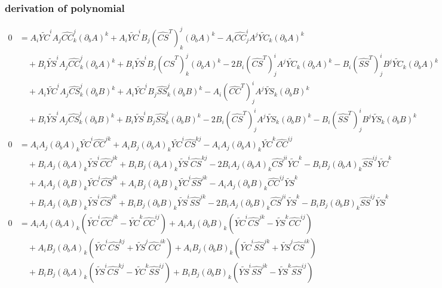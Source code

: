 \documentclass[notitlepage]{article}
\newcommand{\YC}[1][n]{\widetilde{YC}}
\newcommand{\YS}[1][n]{\widetilde{YS}}
\newcommand{\hatCS}[1][nm]{\widehat{CS}}
\newcommand{\hatCC}[1][nm]{\widehat{CC}}
\newcommand{\hatSS}[1][nm]{\widehat{SS}}
\newcommand{\dA}{(\partial_b A)}
\newcommand{\dB}{(\partial_b B)}
\begin{document}
\subsubsection{derivation of polynomial}

\begin{align*}
0 &= A_i\YC^iA_j\hatCC^j_k\dA^k + A_i\YC^iB_j(\hatCS^T)^j_k\dA^k - A_i\hatCC^i_j A^j\YC_k\dA^k\\
  &\quad + B_i\YS^iA_j\hatCC^j_k\dA^k + B_i\YS^iB_j(\hatCS^T)^j_k\dA^k - 2B_i(\hatCS^T)^i_jA^j\YC_k\dA^k - B_i(\hatSS^T)^i_jB^j\YC_k\dA^k\\
  &\quad + A_i\YC^iA_j\hatCS^j_k\dB^k + A_i\YC^iB_j\hatSS^j_k\dB^k - A_i(\hatCC^T)^i_j A^j\YS_k\dB^k\\
  &\quad + B_i\YS^iA_j\hatCS^j_k\dB^k + B_i\YS^iB_j\hatSS^j_k\dB^k - 2B_i(\hatCS^T)^i_jA^j\YS_k\dB^k - B_i(\hatSS^T)^i_jB^j\YS_k\dB^k\\
0 &= A_iA_j\dA_k\YC^i\hatCC^{jk} + A_iB_j\dA_k\YC^i\hatCS^{kj} - A_iA_j\dA_k\YC^k\hatCC^{ij}\\
  &\quad + B_iA_j\dA_k\YS^i\hatCC^{jk} + B_iB_j\dA_k\YS^i\hatCS^{kj} - 2B_iA_j\dA_k\hatCS^{ji}\YC^k - B_iB_j\dA_k\hatSS^{ij}\YC^k\\
  &\quad + A_iA_j\dB_k\YC^i\hatCS^{jk} + A_iB_j\dB_k\YC^i\hatSS^{jk} - A_iA_j\dB_k\hatCC^{ij}\YS^k\\
  &\quad + B_iA_j\dB_k\YS^i\hatCS^{jk} + B_iB_j\dB_k\YS^i\hatSS^{jk} - 2B_iA_j\dB_k\hatCS^{ji}\YS^k - B_iB_j\dB_k\hatSS^{ij}\YS^k\\
0 &= A_iA_j\dA_k\left(\YC^i\hatCC^{jk} -  \YC^k\hatCC^{ij}\right) + A_iA_j\dB_k\left(\YC^i\hatCS^{jk} - \YS^k\hatCC^{ij}\right)\\
  &\quad + A_iB_j\dA_k\left(\YC^i\hatCS^{kj} + \YS^j\hatCC^{ik}\right) + A_iB_j\dB_k\left( \YC^i\hatSS^{jk} + \YS^j\hatCS^{ik}\right)\\
  &\quad + B_iB_j\dA_k\left(\YS^i\hatCS^{kj} - \YC^k\hatSS^{ij}\right) + B_iB_j\dB_k\left(\YS^i\hatSS^{jk} - \YS^k\hatSS^{ij}\right)\\
\end{align*}
\end{document}
